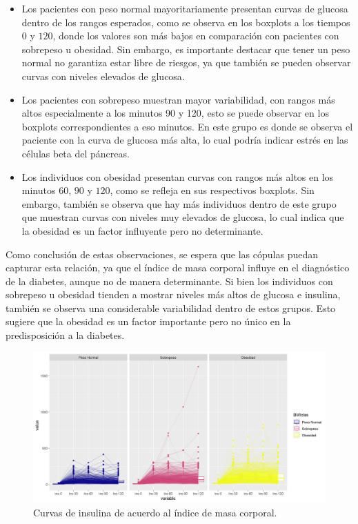 \begin{itemize}
    \item Los pacientes con peso normal mayoritariamente presentan curvas de glucosa dentro de los rangos esperados, como se observa en los boxplots a los tiempos $0$ y $120$, donde los valores son más bajos en comparación con pacientes con sobrepeso u obesidad. Sin embargo, es importante destacar que tener un peso normal no garantiza estar libre de riesgos, ya que también se pueden observar curvas con niveles elevados de glucosa.

    \item Los pacientes con sobrepeso muestran mayor variabilidad, con rangos más altos especialmente a los minutos 90 y 120, esto se puede observar en los boxplots correspondientes a eso minutos. En este grupo es donde se observa el paciente con la curva de glucosa más alta, lo cual podría indicar estrés en las células beta del páncreas.

    \item Los individuos con obesidad presentan curvas con rangos más altos en los minutos $60$, $90$ y $120$, como se refleja en sus respectivos boxplots.  Sin embargo, también se observa que hay más individuos dentro de este grupo que muestran curvas con niveles muy elevados de glucosa, lo cual indica que la obesidad es un factor influyente pero no determinante.
\end{itemize}

Como conclusión de estas observaciones, se espera que las cópulas puedan capturar esta relación, ya que el índice de masa corporal influye en el diagnóstico de la diabetes, aunque no de manera determinante. Si bien los individuos con sobrepeso u obesidad tienden a mostrar niveles más altos de glucosa e insulina, también se observa una considerable variabilidad dentro de estos grupos. Esto sugiere que la obesidad es un factor importante pero no único en la predisposición a la diabetes.


\begin{figure}[H]
    \centering
    \includegraphics[width = 0.9 \textwidth]{Imagenes/insCurvasBMI.png}
    \caption{Curvas de insulina de acuerdo al índice de masa corporal.}
    \label{fig:CurvasInsIBM}
\end{figure}


